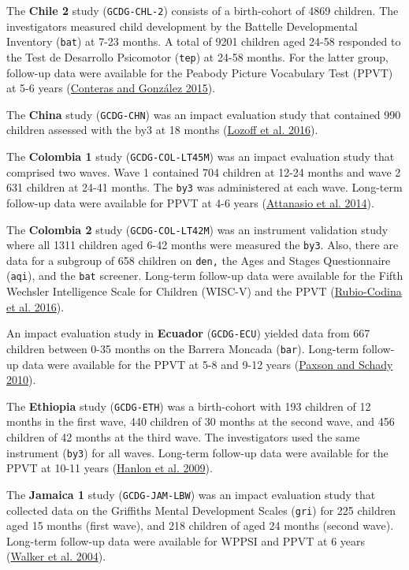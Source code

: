 \documentclass[
]{book}
\begin{document}
The \textbf{Chile 2} study (\texttt{GCDG-CHL-2}) consists of a birth-cohort of 4869 children. The investigators measured child development by the Battelle Developmental Inventory (\texttt{bat}) at 7-23 months. A total of 9201 children aged 24-58 responded to the Test de Desarrollo Psicomotor (\texttt{tep}) at 24-58 months. For the latter group, follow-up data were available for the Peabody Picture Vocabulary Test (PPVT) at 5-6 years (\protect\hyperlink{ref-conteras2015}{Conteras and González 2015}).

The \textbf{China} study (\texttt{GCDG-CHN}) was an impact evaluation study that contained 990 children assessed with the by3 at 18 months (\protect\hyperlink{ref-Lozoff2016}{Lozoff et al. 2016}).

The \textbf{Colombia 1} study (\texttt{GCDG-COL-LT45M}) was an impact evaluation study that comprised two waves. Wave 1 contained 704 children at 12-24 months and wave 2 631 children at 24-41 months. The \texttt{by3} was administered at each wave. Long-term follow-up data were available for PPVT at 4-6 years (\protect\hyperlink{ref-Attanasio2014}{Attanasio et al. 2014}).

The \textbf{Colombia 2} study (\texttt{GCDG-COL-LT42M}) was an instrument validation study where all 1311 children aged 6-42 months were measured the \texttt{by3}. Also, there are data for a subgroup of 658 children on \texttt{den,} the Ages and Stages Questionnaire (\texttt{aqi}), and the \texttt{bat} screener. Long-term follow-up data were available for the Fifth Wechsler Intelligence Scale for Children (WISC-V) and the PPVT (\protect\hyperlink{ref-Rubio-Codina2016}{Rubio-Codina et al. 2016}).

An impact evaluation study in \textbf{Ecuador} (\texttt{GCDG-ECU}) yielded data from 667 children between 0-35 months on the Barrera Moncada (\texttt{bar}). Long-term follow-up data were available for the PPVT at 5-8 and 9-12 years (\protect\hyperlink{ref-Paxson2010}{Paxson and Schady 2010}).

The \textbf{Ethiopia} study (\texttt{GCDG-ETH}) was a birth-cohort with 193 children of 12 months in the first wave, 440 children of 30 months at the second wave, and 456 children of 42 months at the third wave. The investigators used the same instrument (\texttt{by3}) for all waves. Long-term follow-up data were available for the PPVT at 10-11 years (\protect\hyperlink{ref-Hanlon2009}{Hanlon et al. 2009}).

The \textbf{Jamaica 1} study (\texttt{GCDG-JAM-LBW}) was an impact evaluation study that collected data on the Griffiths Mental Development Scales (\texttt{gri}) for 225 children aged 15 months (first wave), and 218 children of aged 24 months (second wave). Long-term follow-up data were available for WPPSI and PPVT at 6 years (\protect\hyperlink{ref-Walker2004}{Walker et al. 2004}).
\end{document}
